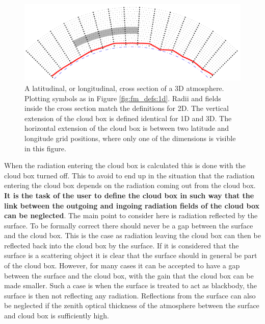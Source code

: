 \begin{figure}[!t]
 \begin{center}
  \includegraphics*[width=0.98\hsize]{atm_dim_3dcross}
  \caption{A latitudinal, or longitudinal, cross section of a 3D atmosphere. 
    Plotting symbols as in Figure \ref{fig:fm_defs:1d}. Radii and
    fields inside the cross section match the definitions for 2D.
    The vertical extension
    of the cloud box is defined identical for 1D and 3D. The horizontal 
    extension of the cloud box is between two latitude and longitude grid
    positions, where only one of the dimensions is visible in this figure.}
  \label{fig:fm_defs:3dcross}
 \end{center}
\end{figure}

When the radiation entering the cloud box is calculated this is done
with the cloud box turned off. This to avoid to end up in the
situation that the radiation entering the cloud box depends on the
radiation coming out from the cloud box. {\bf It is the task of the
  user to define the cloud box in such way that the link between the
  outgoing and ingoing radiation fields of the cloud box can be
  neglected}. The main point to consider here is radiation reflected
by the surface. To be formally correct there should never be a gap
between the surface and the cloud box. This is the case as radiation
leaving the cloud box can then be reflected back into the cloud box by
the surface. If it is considered that the surface is a scattering object
it is clear that the surface should in general be part of the cloud
box. However, for many cases it can be accepted to have a gap between
the surface and the cloud box, with the gain that the cloud box can be
made smaller. Such a case is when the surface is treated to act as
blackbody, the surface is then not reflecting any radiation.
Reflections from the surface can also be neglected if the zenith
optical thickness of the atmosphere between the surface and cloud box
is sufficiently high.


